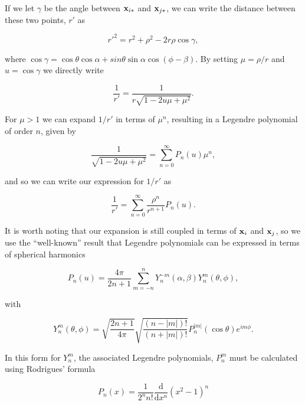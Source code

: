If we let $\gamma$ be the angle between $\mathbf{x}_{i*}$ and $\mathbf{x}_{j*}$, we can write the distance between these two points, $r'$ as

\begin{equation}
	r'^{2} = r^{2} + \rho^{2} - 2r\rho\cos\gamma,
\end{equation}

\noindent
where $\cos\gamma = \cos\theta\cos\alpha + sin\theta\sin\alpha\cos(\phi-\beta)$. By setting $\mu = \rho / r$ and $u = \cos\gamma$ we directly write

\begin{equation}
	\frac{1}{r'} = \frac{1}{r\sqrt{1-2u\mu + \mu^{2}}}.
\end{equation}

For $\mu > 1$ we can expand $1/r'$ in terms of $\mu^{n}$, resulting in a Legendre polynomial of order $n$, given by

\begin{equation}
	\frac{1}{\sqrt{1-2u\mu + \mu^{2}}} = \sum_{n=0}^{\infty}P_n(u)\mu^{n},
\end{equation}

\noindent
and so we can write our expression for $1/r'$ as

\begin{equation}
	\frac{1}{r'} = \sum_{n=0}^{\infty} \frac{\rho^{n}}{r^{n+1}}P_n(u).
	\label{eqn:laplace_2}
\end{equation}

It is worth noting that our expansion is still coupled in terms of $\mathbf{x}_i$ and $\mathbf{x}_j$, so we use the ``well-known'' result \cite{stegun1964} that Legendre polynomials can be expressed in terms of spherical harmonics

\begin{equation}
	P_n(u) = \frac{4\pi}{2n+1}\sum_{m=-n}^{n}Y^{-m}_n(\alpha, \beta)Y^{m}_n(\theta, \phi),
	\label{eqn:laplace_3}
\end{equation}

\noindent
with

\begin{equation}
	Y^{m}_n(\theta, \phi) = \sqrt{\frac{2n+1}{4\pi}}\sqrt{\frac{(n-|m|)!}{(n+|m|)!}}P^{|m|}_n(\cos\theta)e^{im\phi}.
\end{equation}

In this form for $Y^{m}_n$, the associated Legendre polynomials, $P^{m}_n$ must be calculated using Rodrigues' formula \cite{Rodrigues1815}

\begin{equation}
	P_n(x) = \frac{1}{2^{n}n!}\frac{\text{d}}{\text{d}x^{n}}(x^{2}-1)^{n}
\end{equation}

